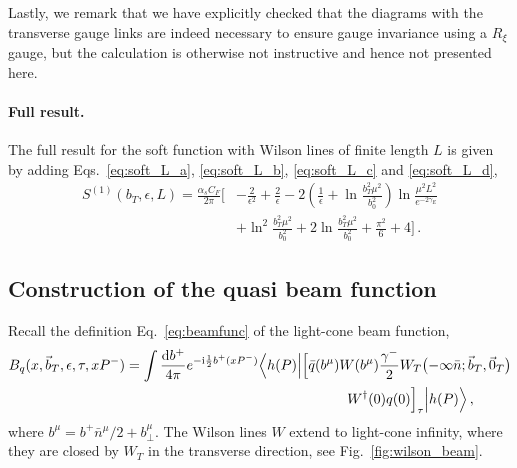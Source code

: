 \documentclass[11pt,a4paper]{article}
\DeclareRobustCommand{\eq}[1]{Eq.~\eqref{eq:#1}}
\DeclareRobustCommand{\fig}[1]{Fig.~\ref{fig:#1}}
\newcommand{\df}{\mathrm{d}}
\newcommand{\img}{\mathrm{i}}
\newcommand{\eps}{\epsilon}
\newcommand{\nn}{\nonumber}
\newcommand{\bn}{{\bar{n}}}
\newcommand{\as}{\alpha_s}
\newcommand{\Lb}[1]{\ln^{#1}\frac{b_T^2 \mu^2}{b_0^2}}
\newcommand{\bt}{\vec b_T}
\begin{document}
Lastly, we remark that we have explicitly checked that the diagrams with
the transverse gauge links are indeed necessary to ensure gauge invariance using a $R_\xi$ gauge,
but the calculation is otherwise not instructive and hence not presented here.

\paragraph{Full result.}
The full result for the soft function with Wilson lines of finite length $L$ is given by adding
Eqs.\ \eqref{eq:soft_L_a}, \eqref{eq:soft_L_b}, \eqref{eq:soft_L_c} and \eqref{eq:soft_L_d},
\begin{align} \label{eq:S_L_nlo}
 S^{(1)}(b_T,\eps,L)
 = \frac{\as C_F}{2\pi} \biggl[& - \frac{2}{\eps^2} + \frac{2}{\eps}
   - 2 \left(\frac{1}{\eps} + \Lb{}\right) \ln\frac{\mu^2 L^2}{e^{-2\gamma_E}}
   \nn\\&
   + \Lb{2} + 2 \Lb{} + \frac{\pi^2}{6} + 4 \biggr]
\,.\end{align}



\subsection{Construction of the quasi beam function}
\label{sec:qbeam}

Recall the definition \eq{beamfunc} of the light-cone beam function,
\begin{align} \label{eq:beam2}
 &B_{q}(x,\bt,\eps,\tau,x P^-) = \int\frac{\df b^+}{4\pi} e^{-\img \frac12 b^+ (x P^-)}
 \Bigl< h(P) \Bigr|  \Bigl[ \bar q(b^\mu)
 W(b^\mu) \frac{\gamma^-}{2}
 W_{T}\bigl(-\infty\bn;\vec b_T,\vec 0_T\bigr)
 \nn\\&\hspace{8.5cm}
 W^\dagger(0)  q(0) \Bigr]_\tau \Bigl| h(P) \Bigr>
\,,\end{align}
where $b^\mu = b^+ \bn^\mu/2 + b_\perp^\mu$. 
The Wilson lines $W$ extend to light-cone infinity, where they are closed by $W_T$ in the transverse direction, see \fig{wilson_beam}.
\end{document}
